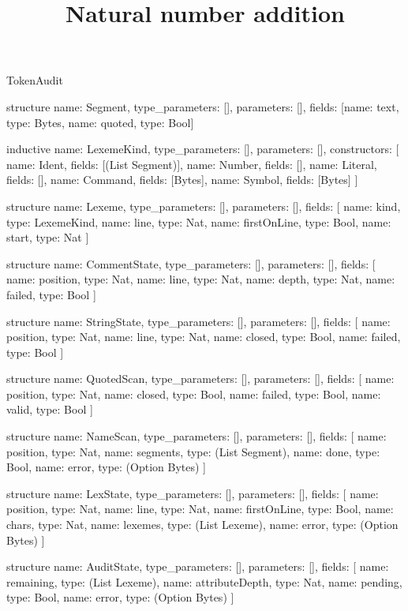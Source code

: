 \begin{lexlean}{TokenAudit}
\title{Natural number addition}
\begin{semanticmodule}
structure{
  name: Segment,
  type_parameters: [],
  parameters: [],
  fields: [{name: text, type: Bytes}, {name: quoted, type: Bool}]
}

inductive{
  name: LexemeKind,
  type_parameters: [],
  parameters: [],
  constructors: [
    {name: Ident, fields: [(List Segment)]},
    {name: Number, fields: []},
    {name: Literal, fields: []},
    {name: Command, fields: [Bytes]},
    {name: Symbol, fields: [Bytes]}
  ]
}

structure{
  name: Lexeme,
  type_parameters: [],
  parameters: [],
  fields: [
    {name: kind, type: LexemeKind},
    {name: line, type: Nat},
    {name: firstOnLine, type: Bool},
    {name: start, type: Nat}
  ]
}

structure{
  name: CommentState,
  type_parameters: [],
  parameters: [],
  fields: [
    {name: position, type: Nat},
    {name: line, type: Nat},
    {name: depth, type: Nat},
    {name: failed, type: Bool}
  ]
}

structure{
  name: StringState,
  type_parameters: [],
  parameters: [],
  fields: [
    {name: position, type: Nat},
    {name: line, type: Nat},
    {name: closed, type: Bool},
    {name: failed, type: Bool}
  ]
}

structure{
  name: QuotedScan,
  type_parameters: [],
  parameters: [],
  fields: [
    {name: position, type: Nat},
    {name: closed, type: Bool},
    {name: failed, type: Bool},
    {name: valid, type: Bool}
  ]
}

structure{
  name: NameScan,
  type_parameters: [],
  parameters: [],
  fields: [
    {name: position, type: Nat},
    {name: segments, type: (List Segment)},
    {name: done, type: Bool},
    {name: error, type: (Option Bytes)}
  ]
}

structure{
  name: LexState,
  type_parameters: [],
  parameters: [],
  fields: [
    {name: position, type: Nat},
    {name: line, type: Nat},
    {name: firstOnLine, type: Bool},
    {name: chars, type: Nat},
    {name: lexemes, type: (List Lexeme)},
    {name: error, type: (Option Bytes)}
  ]
}

structure{
  name: AuditState,
  type_parameters: [],
  parameters: [],
  fields: [
    {name: remaining, type: (List Lexeme)},
    {name: attributeDepth, type: Nat},
    {name: pending, type: Bool},
    {name: error, type: (Option Bytes)}
  ]
}


\end{semanticmodule}
\end{lexlean}
